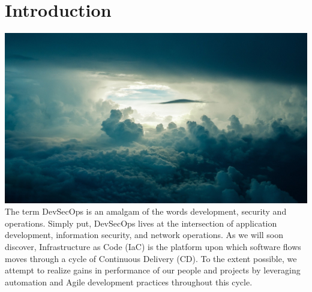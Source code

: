 \makeatletter
{}
\renewcommand{\thefigure}{\thechapter.\@arabic\c@figure}
\makeatother

\hypertarget{Introduction}{%
	\chapter{Introduction}\label{Introduction}}

\includegraphics[scale=0.85]{../images/sky-690293_1920.jpg}
\justify
The term DevSecOps is an amalgam of the words development, security and
operations. Simply put, DevSecOps lives at the intersection of
application development, information security, and network operations.
As we will soon discover, Infrastructure as Code (IaC) is the platform
upon which software flows moves through a cycle of Continuous Delivery
(CD). To the extent possible, we attempt to realize gains in performance
of our people and projects by leveraging automation and Agile
development practices throughout this cycle.

